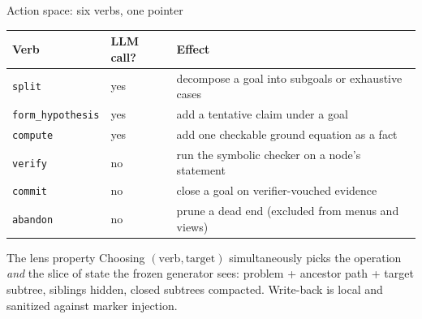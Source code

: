 \documentclass[aspectratio=169]{beamer}
\newcommand{\verbword}[1]{\texttt{#1}}
\begin{document}
\begin{frame}{Action space: six verbs, one pointer}
  \begin{center}
    \footnotesize
    \begin{tabular}{lll}
      \toprule
      Verb & LLM call? & Effect \\
      \midrule
      \verbword{split} & yes & decompose a goal into subgoals or exhaustive cases \\
      \verbword{form\_hypothesis} & yes & add a tentative claim under a goal \\
      \verbword{compute} & yes & add one checkable ground equation as a fact \\
      \verbword{verify} & \alert{no} & run the symbolic checker on a node's statement \\
      \verbword{commit} & \alert{no} & close a goal on verifier-vouched evidence \\
      \verbword{abandon} & \alert{no} & prune a dead end (excluded from menus and views) \\
      \bottomrule
    \end{tabular}
  \end{center}
  \begin{block}{The lens property}
    Choosing $(\text{verb}, \text{target})$ simultaneously picks the
    operation \emph{and} the slice of state the frozen generator sees:
    problem + ancestor path + target subtree, siblings hidden, closed
    subtrees compacted. Write-back is local and sanitized against marker
    injection.
  \end{block}
\end{frame}
\end{document}
